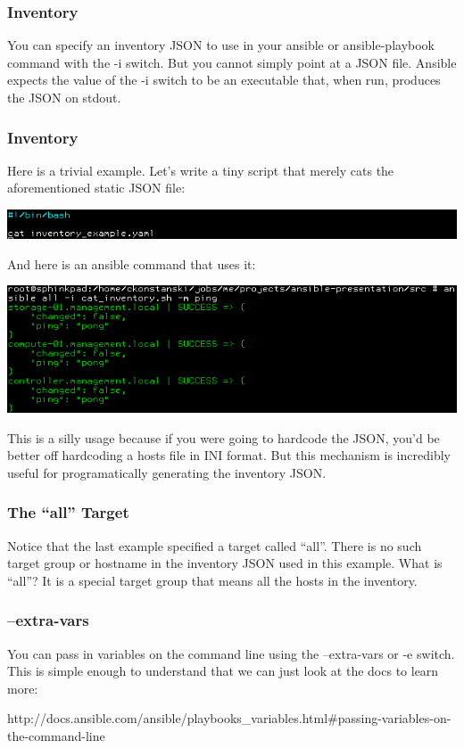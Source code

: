\documentclass[helvetica,english,utf8,notitle,nologo]{beamer}
\begin{document}
\begin{frame}
  \frametitle{Inventory}

  You can specify an inventory JSON to use in your ansible or
  ansible-playbook command with the -i switch. But you cannot simply
  point at a JSON file. Ansible expects the value of the -i switch to
  be an executable that, when run, produces the JSON on stdout.
\end{frame}

\begin{frame}
  \frametitle{Inventory}

  Here is a trivial example. Let's write a tiny script that merely
  cats the aforementioned static JSON file:

  \includegraphics[scale=0.44]{img_10}

  And here is an ansible command that uses it:

  \includegraphics[scale=0.44]{img_11}

  This is a silly usage because if you were going to hardcode the
  JSON, you'd be better off hardcoding a hosts file in INI format. But
  this mechanism is incredibly useful for programatically generating
  the inventory JSON.
\end{frame}

\begin{frame}
  \frametitle{The ``all'' Target}

  Notice that the last example specified a target called
  ``all''. There is no such target group or hostname in the inventory
  JSON used in this example. What is ``all''? It is a special target
  group that means all the hosts in the inventory.
\end{frame}

\begin{frame}
  \frametitle{--extra-vars}

  You can pass in variables on the command line using the --extra-vars
  or -e switch. This is simple enough to understand that we can just
  look at the docs to learn more:

  http://docs.ansible.com/ansible/playbooks\_variables.html\#passing-variables-on-the-command-line
\end{frame}
\end{document}
